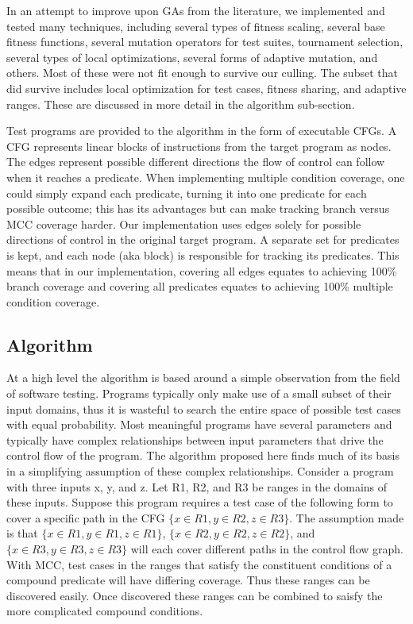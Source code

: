 \documentclass[runningheads]{llncs}
\begin{document}
In an attempt to improve upon GAs from the literature, we implemented and tested many techniques, including several types of fitness scaling, several base fitness functions, several mutation operators for test suites, tournament selection, several types of local optimizations, several forms of adaptive mutation, and others. Most of these were not fit enough to survive our culling. The subset that did survive includes local optimization for test cases, fitness sharing, and adaptive ranges. These are discussed in more detail in the algorithm sub-section.

Test programs are provided to the algorithm in the form of executable CFGs. A CFG represents linear blocks of instructions from the target program as nodes. The edges represent possible different directions the flow of control can follow when it reaches a predicate.  When implementing multiple condition coverage, one could simply expand each predicate, turning it into one predicate for each possible outcome; this has its advantages but can make tracking branch versus MCC coverage harder. Our implementation uses edges solely for possible directions of control in the original target program. A separate set for predicates is kept, and each node (aka block) is responsible for tracking its predicates. This means that in our implementation, covering all edges equates to achieving 100\% branch coverage and covering all predicates equates to achieving 100\% multiple condition coverage. 

\subsection{Algorithm}\label{sec:Alg}
At a high level the algorithm is based around a simple observation from the field of software testing. Programs typically only make use of a small subset of their input domains, thus it is wasteful to search the entire space of possible test cases with equal probability. Most meaningful programs have several parameters and typically have complex relationships between input parameters that drive the control flow of the program. The algorithm proposed here finds much of its basis in a simplifying assumption of these complex relationships. Consider a program with three inputs x, y, and z. Let R1, R2, and R3 be ranges in the domains of these inputs. Suppose this program requires a test case of the following form to cover a specific path in the CFG $\{ x \in R1, y \in R2, z \in R3 \}$. The assumption made is that $\{ x \in R1, y \in R1, z \in R1 \}$, $\{ x \in R2, y \in R2, z \in R2 \}$, and $\{ x \in R3, y \in R3, z \in R3 \}$ will each cover different paths in the control flow graph. With MCC, test cases in the ranges that satisfy the constituent conditions of a compound predicate will have differing coverage. Thus these ranges can be discovered easily. Once discovered these ranges can be combined to saisfy the more complicated compound conditions. 
\end{document}
